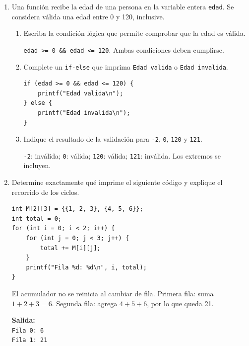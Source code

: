 \begin{enumerate}[label=\textbf{\arabic*.}]
\begin{enumerate}[label=(\alph*)]
\end{enumerate}
\newpage
\item Una función recibe la edad de una persona en la variable entera \texttt{edad}. Se considera válida una edad entre 0 y 120, inclusive.
\begin{enumerate}[label=(\alph*)]
\item Escriba la condición lógica que permite comprobar que la edad es válida.
\ifpauta\begin{solucionbox}\texttt{edad >= 0 \&\& edad <= 120}. Ambas condiciones deben cumplirse.\end{solucionbox}\else\vspace{1.5cm}\fi
\item Complete un \texttt{if-else} que imprima \texttt{Edad valida} o \texttt{Edad invalida}.
\ifpauta\begin{solucionbox}\begin{lstlisting}[style=customc]
if (edad >= 0 && edad <= 120) {
    printf("Edad valida\n");
} else {
    printf("Edad invalida\n");
}
\end{lstlisting}\end{solucionbox}\else\vspace{2cm}\fi
\item Indique el resultado de la validación para \texttt{-2}, \texttt{0}, \texttt{120} y \texttt{121}.
\ifpauta\begin{solucionbox}\texttt{-2}: inválida; \texttt{0}: válida; \texttt{120}: válida; \texttt{121}: inválida. Los extremos se incluyen.\end{solucionbox}\else\vspace{2cm}\fi
\end{enumerate}
\newpage
\item Determine exactamente qué imprime el siguiente código y explique el recorrido de los ciclos.
\begin{lstlisting}[style=customc]
int M[2][3] = {{1, 2, 3}, {4, 5, 6}};
int total = 0;
for (int i = 0; i < 2; i++) {
    for (int j = 0; j < 3; j++) {
        total += M[i][j];
    }
    printf("Fila %d: %d\n", i, total);
}
\end{lstlisting}
\ifpauta\begin{solucionbox}El acumulador no se reinicia al cambiar de fila. Primera fila: suma $1+2+3=6$. Segunda fila: agrega $4+5+6$, por lo que queda 21.\par\textbf{Salida:}\\\texttt{Fila 0: 6}\\\texttt{Fila 1: 21}\end{solucionbox}\else\vspace{3cm}\fi

\end{enumerate}
